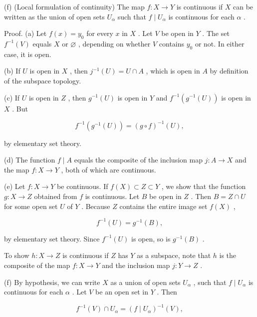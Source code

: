 (f) (Local formulation of continuity) The map \(f : X \rightarrow  Y\) is continuous if \(X\) can be written as the union of open sets \({U}_{\alpha }\) such that \(f \mid  {U}_{\alpha }\) is continuous for each \(\alpha\) .

Proof. (a) Let \(f\left( x\right)  = {y}_{0}\) for every \(x\) in \(X\) . Let \(V\) be open in \(Y\) . The set \({f}^{-1}\left( V\right)\) equals \(X\) or \(\varnothing\) , depending on whether \(V\) contains \({y}_{0}\) or not. In either case, it is open.

(b) If \(U\) is open in \(X\) , then \({j}^{-1}\left( U\right)  = U \cap  A\) , which is open in \(A\) by definition of the subspace topology.

(c) If \(U\) is open in \(Z\) , then \({g}^{-1}\left( U\right)\) is open in \(Y\) and \({f}^{-1}\left( {{g}^{-1}\left( U\right) }\right)\) is open in \(X\) . But

\[
{f}^{-1}\left( {{g}^{-1}\left( U\right) }\right)  = {\left( g \circ  f\right) }^{-1}\left( U\right) ,
\]

by elementary set theory.

(d) The function \(f \mid  A\) equals the composite of the inclusion map \(j : A \rightarrow  X\) and the map \(f : X \rightarrow  Y\) , both of which are continuous.

(e) Let \(f : X \rightarrow  Y\) be continuous. If \(f\left( X\right)  \subset  Z \subset  Y\) , we show that the function \(g : X \rightarrow  Z\) obtained from \(f\) is continuous. Let \(B\) be open in \(Z\) . Then \(B = Z \cap  U\) for some open set \(U\) of \(Y\) . Because \(Z\) contains the entire image set \(f\left( X\right)\) ,

\[
{f}^{-1}\left( U\right)  = {g}^{-1}\left( B\right) ,
\]

by elementary set theory. Since \({f}^{-1}\left( U\right)\) is open, so is \({g}^{-1}\left( B\right)\) .

To show \(h : X \rightarrow  Z\) is continuous if \(Z\) has \(Y\) as a subspace, note that \(h\) is the composite of the map \(f : X \rightarrow  Y\) and the inclusion map \(j : Y \rightarrow  Z\) .

(f) By hypothesis, we can write \(X\) as a union of open sets \({U}_{\alpha }\) , such that \(f \mid  {U}_{\alpha }\) is continuous for each \(\alpha\) . Let \(V\) be an open set in \(Y\) . Then

\[
{f}^{-1}\left( V\right)  \cap  {U}_{\alpha } = {\left( f \mid  {U}_{\alpha }\right) }^{-1}\left( V\right) ,
\]

